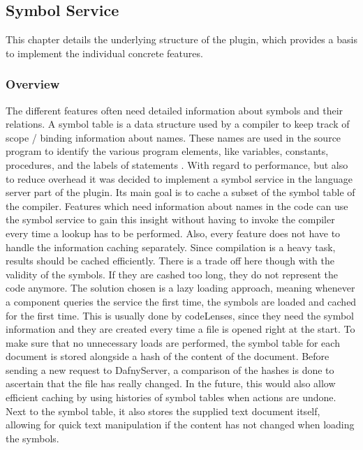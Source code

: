 \subsection{Symbol Service}\label{environment}
This chapter details the underlying structure of the plugin, which provides a basis to implement the individual concrete features.
\subsubsection{Overview}\label{symbolservice}
The different features often need detailed information about symbols and their relations. A symbol table is a data structure used by a compiler to keep track of scope / binding information about names. These names are used in the source program to identify the various program elements, like variables, constants, procedures, and the labels of statements \cite[239]{compiler}. \newline
With regard to performance, but also to reduce overhead it was decided to implement a symbol service in the language server part of the plugin. Its main goal is to cache a subset of the symbol table of the compiler. Features which need information about names in the code can use the symbol service to gain this insight without having to invoke the compiler every time a lookup has to be performed. Also, every feature does not have to handle the information caching separately. \newline
Since compilation is a heavy task, results should be cached efficiently. There is a trade off here though with the validity of the symbols. If they are cashed too long, they do not represent the code anymore. The solution chosen is a lazy loading approach, meaning whenever a component queries the service the first time, the symbols are loaded and cached for the first time. This is usually done by codeLenses, since they need the symbol information and they are created every time a file is opened right at the start. To make sure that no unnecessary loads are performed, the symbol table for each document is stored alongside a hash of the content of the document. Before sending a new request to DafnyServer, a comparison of the hashes is done to ascertain that the file has really changed. In the future, this would also allow efficient caching by using histories of symbol tables when actions are undone. Next to the symbol table, it also stores the supplied text document itself, allowing for quick text manipulation if the content has not changed when loading the symbols.\newline
